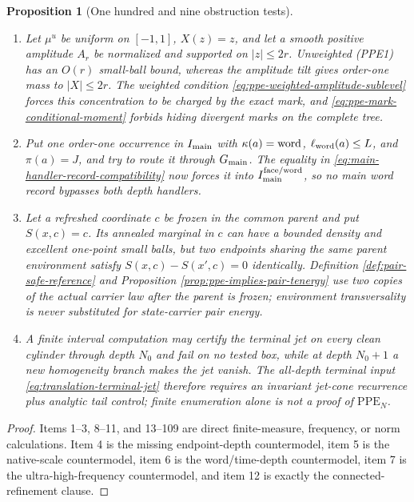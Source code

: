 \documentclass[11pt]{article}
\newtheorem{proposition}[theorem]{Proposition}
\begin{document}
\begin{proposition}[One hundred and nine obstruction tests]
\begin{enumerate}[label=\textup{(T\arabic*)}]
      Proposition~\ref{prop:scaled-face-density} therefore makes no global
      moment claim; the complete-law moment ledger is indispensable.
\item Let $\mu^u$ be uniform on $[-1,1]$, $X(z)=z$, and let a smooth positive
      amplitude $A_r$ be normalized and supported on $|z|\le2r$.  Unweighted
      \textup{(PPE1)} has an $O(r)$ small-ball bound, whereas the amplitude
      tilt gives order-one mass to $|X|\le2r$.  The weighted condition
      \eqref{eq:ppe-weighted-amplitude-sublevel} forces this concentration to
      be charged by the exact mark, and
      \eqref{eq:ppe-mark-conditional-moment} forbids hiding divergent marks
      on the complete tree.
\item Put one order-one occurrence in $I_{\rm main}$ with
      $\kappa(a)={\rm word}$, $\ell_{\rm word}(a)\le L$, and $\pi(a)=J$, and
      try to route it through $G_{\rm main}$.  The equality in
      \eqref{eq:main-handler-record-compatibility} now forces it into
      $I_{\rm main}^{\rm face/word}$, so no main word record bypasses both
      depth handlers.
\item Let a refreshed coordinate $c$ be frozen in the common parent and put
      $S(x,c)=c$.  Its annealed marginal in $c$ can have a bounded density and
      excellent one-point small balls, but two endpoints sharing the same
      parent environment satisfy $S(x,c)-S(x',c)=0$ identically.  Definition
      \ref{def:pair-safe-reference} and Proposition
      \ref{prop:ppe-implies-pair-tenergy} use two copies of the actual carrier
      law after the parent is frozen; environment transversality is never
      substituted for state-carrier pair energy.
\item A finite interval computation may certify the terminal jet on every
      clean cylinder through depth $N_0$ and fail on no tested box, while at
      depth $N_0+1$ a new homogeneity branch makes the jet vanish.  The
      all-depth terminal input \eqref{eq:translation-terminal-jet} therefore
      requires an invariant jet-cone recurrence plus analytic tail control;
      finite enumeration alone is not a proof of $\mathrm{PPE}_{N}$.
\end{enumerate}
\end{proposition}

\begin{proof}
Items 1--3, 8--11, and 13--109 are direct finite-measure, frequency, or norm
calculations.  Item 4 is the missing endpoint-depth countermodel, item 5 is
the native-scale countermodel, item 6 is the word/time-depth countermodel,
item 7 is the ultra-high-frequency countermodel, and item 12 is exactly the
connected-refinement clause.
\end{proof}
\end{document}
